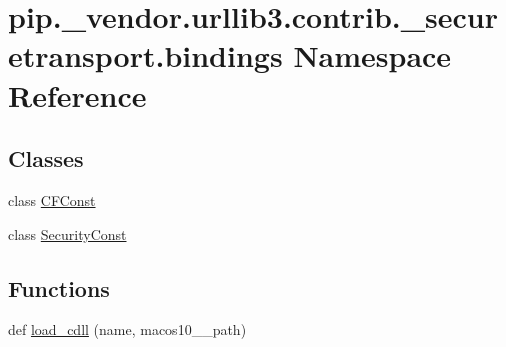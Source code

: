 \hypertarget{namespacepip_1_1__vendor_1_1urllib3_1_1contrib_1_1__securetransport_1_1bindings}{}\section{pip.\+\_\+vendor.\+urllib3.\+contrib.\+\_\+securetransport.\+bindings Namespace Reference}
\label{namespacepip_1_1__vendor_1_1urllib3_1_1contrib_1_1__securetransport_1_1bindings}
\subsection*{Classes}
\begin{DoxyCompactItemize}
\item 
class \hyperlink{classpip_1_1__vendor_1_1urllib3_1_1contrib_1_1__securetransport_1_1bindings_1_1CFConst}{C\+F\+Const}
\item 
class \hyperlink{classpip_1_1__vendor_1_1urllib3_1_1contrib_1_1__securetransport_1_1bindings_1_1SecurityConst}{Security\+Const}
\end{DoxyCompactItemize}
\subsection*{Functions}
\begin{DoxyCompactItemize}
\item 
def \hyperlink{namespacepip_1_1__vendor_1_1urllib3_1_1contrib_1_1__securetransport_1_1bindings_a00f809dce11dc3e2cd8e307b2e324e80}{load\+\_\+cdll} (name, macos10\+\_\+\_\+path)
\end{DoxyCompactItemize}
